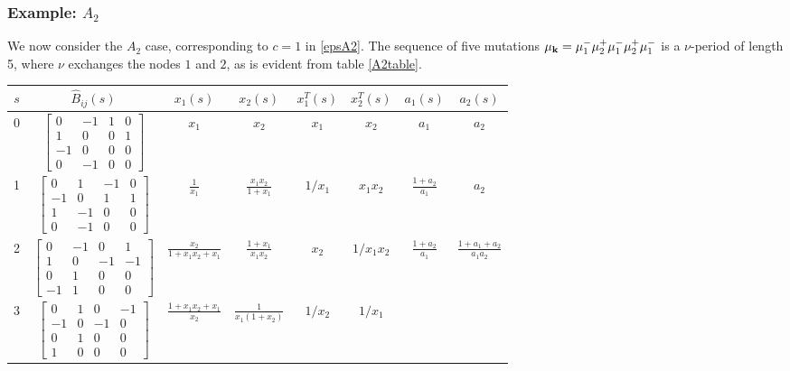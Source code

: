 \documentclass[12pt,reqno]{article}
\numberwithin{equation}{section}
\newcommand{\bfk}{{\bf k}}
\def\ind{s}
\numberwithin{equation}{section}
\begin{document}
\subsubsection{Example: $A_2$}
We now consider the $A_2$ case, corresponding to $c=1$ in \eqref{epsA2}.
The sequence of five mutations $\mu_{\bfk}=
\mu_1^- \mu_2^+ \mu_1^-  \mu_2^+ \mu_1^-$
is a $\nu$-period of length 5, where $\nu$ exchanges the nodes $1$ and $2$, as is evident from table \ref{A2table}.
\begin{table}[htb]
\begin{center}
\begin{tabular}{|c||c||c|c||c|c||c|c||}
\hline
$\ind $ &$ \hat B_{ij}(\ind) $&$ x_1(\ind) $&$ x_2(\ind) $& $x_1^T(\ind) $& $x_2^T(\ind)$ &$ a_1(\ind)$
&$ a_2(\ind)$\\
\hline
0 &{\scriptsize $\left[
\begin{array}{cccc}
 0 & -1 & 1 & 0 \\
 1 & 0 & 0 & 1 \\
 -1 & 0 & 0 & 0 \\
 0 & -1 & 0 & 0
\end{array}
\right]$}
 & $x_1$ & $x_2$&$ x_1 $&$ x_2$ &$   a_1$ &$ a_2 $ \\
1&
{\scriptsize
$\left[
\begin{array}{cccc}
 0 & 1 & -1 & 0 \\
 -1 & 0 & 1 & 1 \\
 1 & -1 & 0 & 0 \\
 0 & -1 & 0 & 0
\end{array}
\right]$}
&
$\frac{1}{x_1}  $& $\frac{x_1 x_2}{1+x_1} $&$ 1/x_1$ & $x_1 x_2 $&$  \frac{1+a_2}{a_1} $&$ a_2$\\
2&
{\scriptsize
$\left[
\begin{array}{cccc}
 0 & -1 & 0 & 1 \\
 1 & 0 & -1 & -1 \\
 0 & 1 & 0 & 0 \\
 -1 & 1 & 0 & 0
\end{array}
\right]$}
&$\frac{x_2}{1+x_1 x_2+x_1} $&$ \frac{1+x_1}{x_1 x_2} $&$ x_2$ &$ 1/x_1 x_2
$&$  \frac{1+a_2}{a_1} $& $\frac{1+a_1+a_2}{a_1a_2} $\\
3&
{\scriptsize
$\left[
\begin{array}{cccc}
 0 & 1 & 0 & -1 \\
 -1 & 0 & -1 & 0 \\
 0 & 1 & 0 & 0 \\
 1 & 0 & 0 & 0
\end{array}
\right]$}
&$\frac{1+x_1 x_2+x_1} {x_2}$ & $\frac{1}{x_1(1+x_2)} $&$ 1/x_2$ & $1/x_1 $&

\end{tabular}
\end{center}
\end{table}
\end{document}

